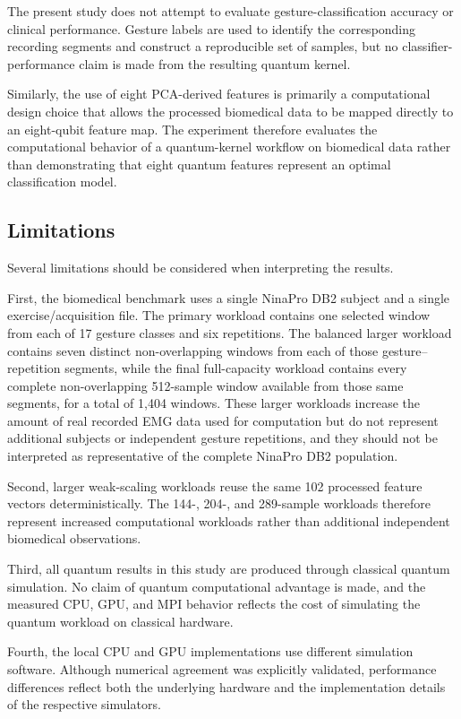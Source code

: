 \documentclass[pdflatex,sn-mathphys-num]{sn-jnl}%
\theoremstyle{thmstyleone}%
\theoremstyle{thmstyletwo}%
\theoremstyle{thmstylethree}%
\begin{document}
The present study does not attempt to evaluate gesture-classification accuracy
or clinical performance. Gesture labels are used to identify the corresponding
recording segments and construct a reproducible set of samples, but no
classifier-performance claim is made from the resulting quantum kernel.

Similarly, the use of eight PCA-derived features is primarily a computational
design choice that allows the processed biomedical data to be mapped directly
to an eight-qubit feature map. The experiment therefore evaluates the
computational behavior of a quantum-kernel workflow on biomedical data rather
than demonstrating that eight quantum features represent an optimal
classification model.


\subsection{Limitations}\label{subsec:limitations}

Several limitations should be considered when interpreting the results.

First, the biomedical benchmark uses a single NinaPro DB2 subject and a single
exercise/acquisition file. The primary workload contains one selected window
from each of 17 gesture classes and six repetitions. The balanced larger
workload contains seven distinct non-overlapping windows from each of those
gesture--repetition segments, while the final full-capacity workload contains
every complete non-overlapping 512-sample window available from those same
segments, for a total of 1,404 windows. These larger workloads increase the
amount of real recorded EMG data used for computation but do not represent
additional subjects or independent gesture repetitions, and they should not
be interpreted as representative of the complete NinaPro DB2 population.

Second, larger weak-scaling workloads reuse the same 102 processed feature
vectors deterministically. The 144-, 204-, and 289-sample workloads therefore
represent increased computational workloads rather than additional independent
biomedical observations.

Third, all quantum results in this study are produced through classical quantum
simulation. No claim of quantum computational advantage is made, and the
measured CPU, GPU, and MPI behavior reflects the cost of simulating the quantum
workload on classical hardware.

Fourth, the local CPU and GPU implementations use different simulation
software. Although numerical agreement was explicitly validated, performance
differences reflect both the underlying hardware and the implementation details
of the respective simulators.
\end{document}
